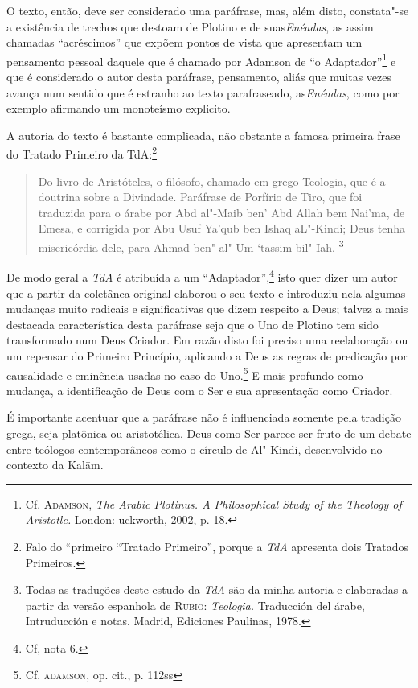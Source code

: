 O texto, então, deve ser considerado uma paráfrase, mas, além
disto, constata"-se a existência de trechos que destoam de
Plotino e de suas\emph{Enéadas}, as assim chamadas “acréscimos” que
expõem pontos de vista que apresentam um pensamento pessoal
daquele que é chamado por Adamson de “o Adaptador”\footnote{
Cf. \textsc{Adamson}, \emph{The Arabic Plotinus. A
Philosophical Study of the Theology of Aristotle.} London:
uckworth, 2002, p. 18.} e que é considerado o autor desta
paráfrase, pensamento, aliás que muitas vezes avança num sentido
que é estranho ao texto parafraseado, as\emph{Enéadas}, como por
exemplo afirmando um monoteísmo explicito.

A autoria do texto é bastante complicada, não obstante a famosa
primeira frase do Tratado Primeiro da TdA:\footnote{ Falo do
“primeiro “Tratado Primeiro”, porque a \emph{TdA} apresenta
dois Tratados Primeiros.}

\begin{quote}
Do livro de Aristóteles, o filósofo, chamado em grego Teologia,
que é a doutrina sobre a Divindade. Paráfrase de Porfírio de
Tiro, que foi traduzida para o árabe por Abd al"-Maib ben' Abd
Allah bem Nai'ma, de Emesa, e corrigida por Abu Usuf Ya'qub ben
Ishaq aL"-Kindi;  Deus tenha misericórdia dele, para Ahmad
ben"-al"-Um ‘tassim bil"-Iah. \footnote{ Todas as traduções deste
estudo da \emph{TdA} são da minha autoria e elaboradas a
partir da versão espanhola de \textsc{Rubio}:
\emph{Teologia.} Traducción del árabe, Intruducción e notas.
Madrid, Ediciones Paulinas, 1978.}  
\end{quote}

De modo geral a \emph{TdA} é atribuída a um
“Adaptador”,\footnote{ Cf, nota 6.} isto quer dizer um autor que
a partir da coletânea original elaborou o seu texto e introduziu
nela algumas mudanças muito radicais e significativas que dizem
respeito a Deus; talvez a mais destacada característica desta
paráfrase seja que o Uno de Plotino tem sido transformado num
Deus Criador. Em razão disto foi preciso uma reelaboração ou um
repensar do Primeiro Princípio, aplicando a Deus as regras de
predicação por causalidade e eminência usadas no caso do
Uno.\footnote{ Cf. \textsc{adamson}, op. cit., p. 112ss} 
E mais profundo como mudança, a identificação de Deus com o Ser
e sua apresentação como Criador. 

É importante acentuar que a paráfrase não é influenciada somente
pela tradição grega, seja platônica ou aristotélica.
Deus como Ser parece ser fruto de um debate entre teólogos
contemporâneos como o círculo de Al"-Kindi, desenvolvido no
contexto da Kal\={a}m.

